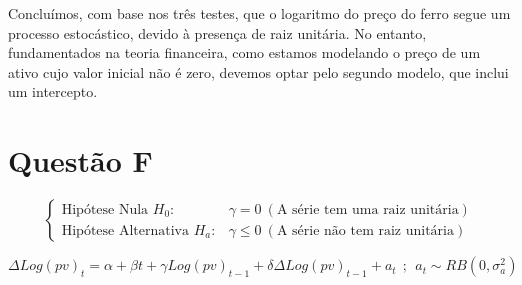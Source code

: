 \documentclass[a4paper,12pt]{article}[abntex2]
\begin{document}
Concluímos, com base nos três testes, que o logaritmo do preço do ferro segue um processo estocástico, devido à presença de raiz unitária. No entanto, fundamentados na teoria financeira, como estamos modelando o preço de um ativo cujo valor inicial não é zero, devemos optar pelo segundo modelo, que inclui um intercepto.

\section*{\textbf{Questão F}}

\[
\left\{
\begin{array}{ll}
    \text{Hipótese Nula } H_0: & \gamma = 0 \ (\text{A série tem uma raiz unitária}) \\
    \text{Hipótese Alternativa } H_a: & \gamma \leqslant 0 \ (\text{A série não tem raiz unitária})
\end{array}
\right.
\]

\begin{equation}
    \Delta Log(pv)_t = \alpha + \beta t + \gamma Log(pv)_{t-1} + \delta \Delta Log(pv)_{t-1} + a_t \ \ ; \ \ a_t \sim RB(0, \sigma_a^2)   
    \label{eq:taltallpv}
\end{equation}
\end{document}
